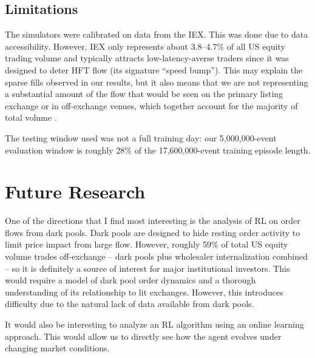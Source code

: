 \documentclass{article}
\begin{document}
\subsection{Limitations}
\label{sec:limitations}

The simulators were calibrated on data from the IEX. This was done due to data accessibility. However, IEX only represents about 3.8--4.7\% of all US equity trading volume \citep{iexmarketshare2026} and typically attracts low-latency-averse traders since it was designed to deter HFT flow (its signature ``speed bump''). This may explain the sparse fills observed in our results, but it also means that we are not representing a substantial amount of the flow that would be seen on the primary listing exchange or in off-exchange venues, which together account for the majority of total volume \citep{tradealgo2026}.

The testing window used was not a full training day: our 5{,}000{,}000-event evaluation window is roughly 28\% of the 17{,}600{,}000-event training episode length.

\section{Future Research}

One of the directions that I find most interesting is the analysis of RL on order flows from dark pools. Dark pools are designed to hide resting order activity to limit price impact from large flow. However, roughly 59\% of total US equity volume trades off-exchange -- dark pools plus wholesaler internalization combined \citep{tradealgo2026} -- so it is definitely a source of interest for major institutional investors. This would require a model of dark pool order dynamics and a thorough understanding of its relationship to lit exchanges. However, this introduces difficulty due to the natural lack of data available from dark pools.

It would also be interesting to analyze an RL algorithm using an online learning approach. This would allow us to directly see how the agent evolves under changing market conditions.




\end{document}
